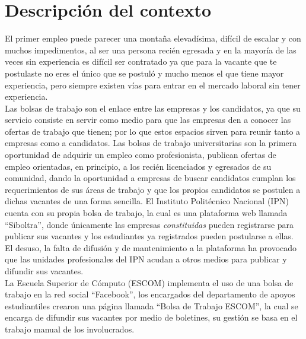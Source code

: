 \section{Descripción del contexto}
El primer empleo puede parecer una montaña elevadísima, difícil de escalar y con muchos impedimentos, al ser una persona recién egresada y en la mayoría de las veces sin experiencia es difícil ser contratado ya que para la vacante que te postulaste no eres el único que se postuló y mucho menos el que tiene mayor experiencia, pero siempre existen vías para entrar en el mercado laboral sin tener experiencia. \\
\newline
Las bolsas de trabajo son el enlace entre las empresas y los candidatos, ya que su servicio consiste en servir como medio para que las empresas den a conocer las ofertas de trabajo que tienen; por lo que estos espacios sirven para reunir tanto a empresas como a candidatos.\cite{Occ3}
Las bolsas de trabajo universitarias son la primera oportunidad de adquirir un empleo como profesionista, publican ofertas de empleo orientadas, en principio, a los recién licenciados y egresados de su comunidad, dando la oportunidad a empresas de buscar candidatos cumplan los requerimientos de sus áreas de trabajo y que los propios candidatos se postulen a dichas vacantes de una forma sencilla.\cite{Universia}  
\newline
El Instituto Politécnico Nacional (IPN) cuenta con su propia bolsa de trabajo, la cual es una plataforma web llamada ``Siboltra'', donde únicamente las empresas \textit{constituidas} pueden registrarse para publicar sus vacantes y los estudiantes ya registrados pueden postularse a ellas. 
El desuso, la falta de difusión y de mantenimiento a la plataforma ha provocado que las unidades profesionales del IPN acudan a otros medios para publicar y difundir sus vacantes.\cite{Siboltra} \\
La Escuela Superior de Cómputo (ESCOM) implementa el uso de una bolsa de trabajo en la red social ``Facebook'', los encargados del departamento
de apoyos estudiantiles crearon una página llamada ``Bolsa de Trabajo ESCOM'', la cual se encarga de difundir sus vacantes por medio 
de boletines, su gestión se basa en el trabajo manual de los involucrados. 

